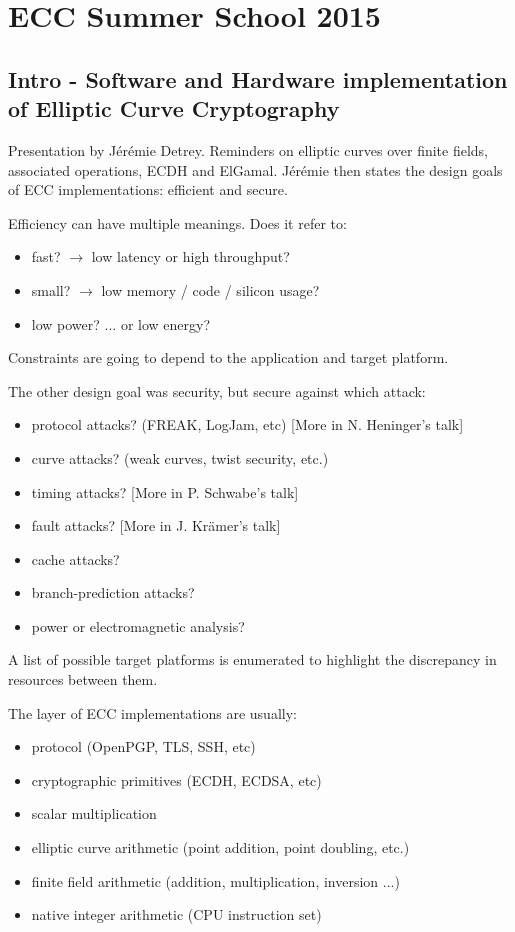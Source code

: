 \documentclass[11pt]{article}
\begin{document}
\section{ECC Summer School 2015}
\subsection{Intro - Software and Hardware implementation of Elliptic Curve Cryptography}
Presentation by Jérémie Detrey.
Reminders on elliptic curves over finite fields, associated operations, ECDH and ElGamal. \newline
Jérémie then states the design goals of ECC implementations: efficient and secure. 

Efficiency can have multiple meanings. Does it refer to:
\begin{itemize}
	\item fast? $\to$ low latency or high throughput?
	\item small? $\to$ low memory / code / silicon usage?
	\item low power? ... or low energy?
\end{itemize}
Constraints are going to depend to the application and target platform.

The other design goal was security, but secure against which attack:
\begin{itemize}
	\item protocol attacks? (FREAK, LogJam, etc) [More in N. Heninger's talk]
	\item curve attacks? (weak curves, twist security, etc.)
	\item timing attacks? [More in P. Schwabe's talk]
	\item fault attacks? [More in J. Krämer's talk]
	\item cache attacks?
	\item branch-prediction attacks?
	\item power or electromagnetic analysis?
\end{itemize}

A list of possible target platforms is enumerated to highlight the discrepancy in resources between them.

The layer of ECC implementations are usually: 
\begin{itemize}
	\item protocol (OpenPGP, TLS, SSH, etc)
	\item cryptographic primitives (ECDH, ECDSA, etc)
	\item scalar multiplication
	\item elliptic curve arithmetic (point addition, point doubling, etc.)
	\item finite field arithmetic (addition, multiplication, inversion ...)
	\item native integer arithmetic (CPU instruction set)
\end{itemize}
\end{document}
